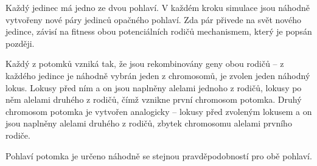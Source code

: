 Každý jedinec má jedno ze dvou pohlaví. V každém kroku simulace jsou náhodně vytvořeny nové páry jedinců opačného
pohlaví. Zda pár přivede na svět nového jedince, závisí na fitness obou potenciálních rodičů mechanismem, který je
popsán později.

Každý z potomků vzniká tak, že jsou rekombinovány geny obou rodičů -- z každého jedince je náhodně vybrán jeden
z chromosomů, je zvolen jeden náhodný lokus. Lokusy před ním a on jsou naplněny alelami jednoho z rodičů,
lokusy po něm alelami druhého z rodičů, čímž vznikne první chromosom potomka. Druhý chromosom potomka je vytvořen
analogicky -- lokusy před zvoleným lokusem a on jsou naplněny alelami druhého z rodičů, zbytek chromosomu alelami
prvního rodiče.

Pohlaví potomka je určeno náhodně se stejnou pravděpodobností pro obě pohlaví.

